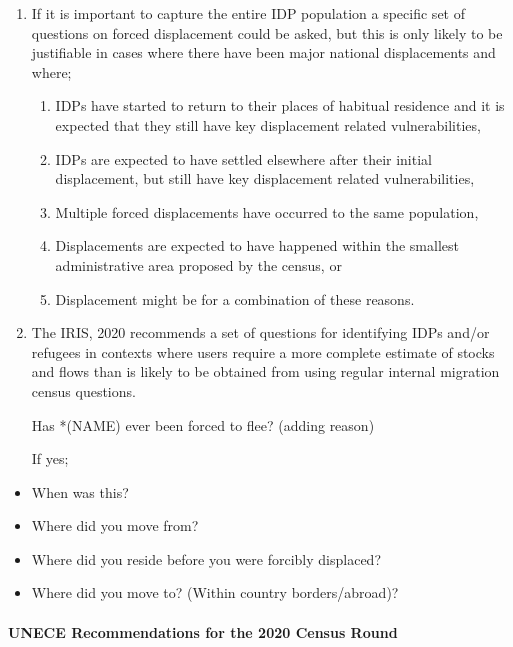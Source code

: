 \documentclass[
]{article}
\begin{document}
\begin{enumerate}
\def\labelenumi{\arabic{enumi}.}
\setcounter{enumi}{93}
\item
  If it is important to capture the entire IDP population a specific
  set of questions on forced displacement could be asked, but this is
  only likely to be justifiable in cases where there have been major
  national displacements and where;

  \begin{enumerate}
  \def\labelenumii{\arabic{enumii}.}
  \setcounter{enumii}{14}
  \item
    IDPs have started to return to their places of habitual
    residence and it is expected that they still have key
    displacement related vulnerabilities,
  \item
    IDPs are expected to have settled elsewhere after their initial
    displacement, but still have key displacement related
    vulnerabilities,
  \item
    Multiple forced displacements have occurred to the same
    population,
  \item
    Displacements are expected to have happened within the smallest
    administrative area proposed by the census, or
  \item
    Displacement might be for a combination of these reasons.
  \end{enumerate}
\item
  The IRIS, 2020 recommends a set of questions for identifying IDPs
  and/or refugees in contexts where users require a more complete
  estimate of stocks and flows than is likely to be obtained from
  using regular internal migration census questions.

  Has *(NAME) ever been forced to flee? (adding reason)

  If yes;
\end{enumerate}

\begin{itemize}
\item
  When was this?
\item
  Where did you move from?
\item
  Where did you reside before you were forcibly displaced?
\item
  Where did you move to? (Within country borders/abroad)?
\end{itemize}

\hypertarget{a.2.-unece-recommendations-for-the-2020-census-round}{%
\paragraph{UNECE Recommendations for the 2020 Census Round}\label{a.2.-unece-recommendations-for-the-2020-census-round}}
\end{document}
